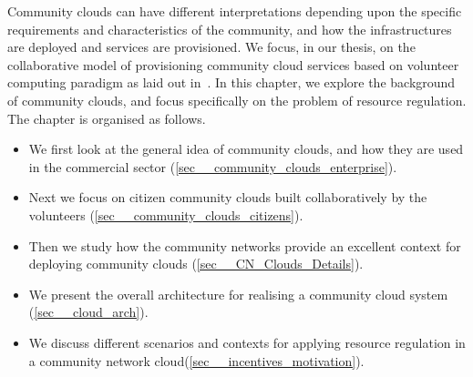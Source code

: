 
Community clouds can have different interpretations depending upon the specific requirements and characteristics of the community, 
and how the infrastructures are deployed and services are provisioned.
We focus, in our thesis, 
on the collaborative model of provisioning community cloud 
services based on volunteer computing paradigm as laid out in~\cite{Marinos2009}.
In this chapter, we explore the background of community clouds,
and focus specifically on the problem of resource regulation.
%
The chapter is organised as follows.

\begin{itemize}
	\item We first look at the general idea of community clouds, 
	and how they are used in the commercial sector (\cref{sec__community_clouds_enterprise}).

	\item Next we focus on citizen community clouds built collaboratively 
	by the volunteers (\cref{sec__community_clouds_citizens}). 

	\item Then we study how the community networks provide an excellent context 
	for deploying community clouds (\cref{sec__CN_Clouds_Details}).
	
	\item We present the overall architecture for realising 
	a community cloud system (\cref{sec__cloud_arch}).
	
	\item We discuss different scenarios and contexts for applying 
	resource regulation in a community network cloud(\cref{sec__incentives_motivation}).
	
\end{itemize}

